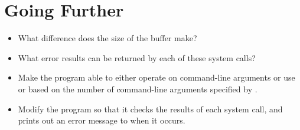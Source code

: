 \section{Going Further}

\begin{itemize}\item What difference does the size of the buffer make? 
\item What error results can be returned by each of these system calls? 
\item Make the program able to either operate on command-line arguments or use  or  based on the number of command-line arguments specified by . 
\item Modify the program so that it checks the results of each system call, and prints out an error message to  when it occurs. 
\end{itemize}

